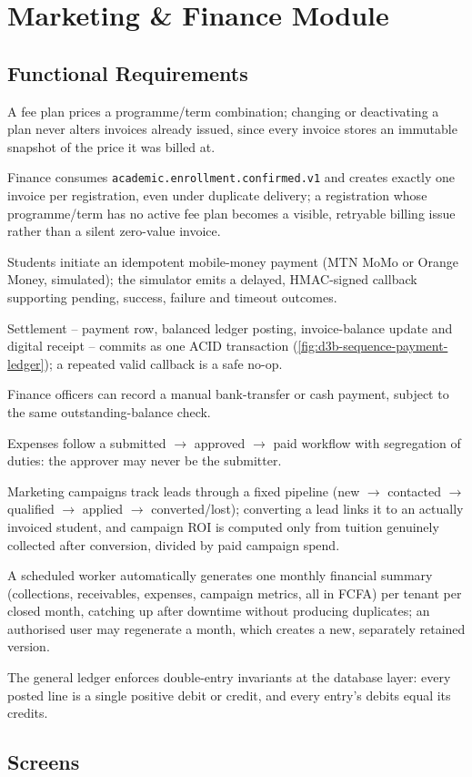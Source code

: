\section{Marketing \& Finance Module}
\label{sec:finance-module}

\subsection{Functional Requirements}
\begin{reqlist}
  \setcounter{reqlisti}{10}
  \item A fee plan prices a programme/term combination; changing or
    deactivating a plan never alters invoices already issued, since every
    invoice stores an immutable snapshot of the price it was billed at.
  \item Finance consumes \texttt{academic.enrollment.confirmed.v1} and creates
    exactly one invoice per registration, even under duplicate delivery; a
    registration whose programme/term has no active fee plan becomes a
    visible, retryable billing issue rather than a silent zero-value invoice.
  \item Students initiate an idempotent mobile-money payment (MTN MoMo or
    Orange Money, simulated); the simulator emits a delayed, HMAC-signed
    callback supporting pending, success, failure and timeout outcomes.
  \item Settlement -- payment row, balanced ledger posting, invoice-balance
    update and digital receipt -- commits as one ACID transaction
    (\cref{fig:d3b-sequence-payment-ledger}); a repeated valid callback is a
    safe no-op.
  \item Finance officers can record a manual bank-transfer or cash payment,
    subject to the same outstanding-balance check.
  \item Expenses follow a submitted $\to$ approved $\to$ paid workflow with
    segregation of duties: the approver may never be the submitter.
  \item Marketing campaigns track leads through a fixed pipeline
    (new $\to$ contacted $\to$ qualified $\to$ applied $\to$ converted/lost);
    converting a lead links it to an actually invoiced student, and
    campaign ROI is computed only from tuition genuinely collected after
    conversion, divided by paid campaign spend.
  \item A scheduled worker automatically generates one monthly financial
    summary (collections, receivables, expenses, campaign metrics, all in
    FCFA) per tenant per closed month, catching up after downtime without
    producing duplicates; an authorised user may regenerate a month, which
    creates a new, separately retained version.
  \item The general ledger enforces double-entry invariants at the database
    layer: every posted line is a single positive debit or credit, and every
    entry's debits equal its credits.
\end{reqlist}

\subsection{Screens}
